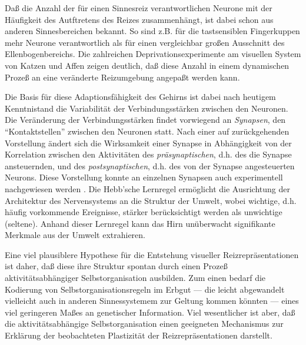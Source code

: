 Daß die Anzahl der für einen Sinnesreiz verantwortlichen Neurone mit der
Häufigkeit des Autftretens des Reizes zusammenhängt, ist dabei schon aus
anderen Sinnesbereichen bekannt. So sind z.B. für die tastsensiblen
Fingerkuppen mehr Neurone verantwortlich als für einen vergleichbar
großen Ausschnitt des Ellenbogenbereichs. Die zahlreichen
Deprivationsexperimente am visuellen System von Katzen und Affen zeigen
deutlich, daß diese Anzahl in einem dynamischen Prozeß an eine
veränderte Reizumgebung angepaßt werden kann.

Die Basis für diese Adaptionsfähigkeit des Gehirns ist dabei nach
heutigem Kenntnistand die Variabilität der Verbindungsstärken zwischen
den Neuronen. Die Veränderung der Verbindungsstärken findet vorwiegend
an \emph{Synapsen}, den ``Kontaktstellen'' zwischen den Neuronen statt.
Nach einer auf \textcite{hebb:1949} zurückgehenden Vorstellung ändert
sich die Wirksamkeit einer Synapse in Abhängigkeit von der Korrelation
zwischen den Aktivitäten des \emph{präsynaptischen}, d.h. des die Synapse
ansteuernden, und des \emph{postsynaptischen}, d.h. des von der Synapse
angesteuerten Neurons. Diese Vorstellung konnte an einzelnen Synapsen auch
experimentell nachgewiesen werden \cite{brown:1990,kirkwood:1994}. Die
Hebb'sche Lernregel ermöglicht die Ausrichtung der Architektur des
Nervensystems an die Struktur der Umwelt, wobei wichtige, d.h. häufig
vorkommende Ereignisse, stärker berücksichtigt werden als unwichtige
(seltene). Anhand dieser Lernregel kann das Hirn unüberwacht signifikante
Merkmale aus der Umwelt extrahieren.

Eine viel plausiblere Hypothese für die Entstehung visueller
Reizrepräsentationen ist daher, daß diese ihre Struktur spontan durch
einen Prozeß aktivitätsabhängiger Selbstorganisation ausbilden. Zum
einen bedarf die Kodierung von Selbstorganisationsregeln im Erbgut --- die
leicht abgewandelt vielleicht auch in anderen Sinnessystemem zur Geltung
kommen könnten --- eines viel geringeren Maßes an genetischer
Information. Viel wesentlicher ist aber, daß die aktivitätsabhängige
Selbstorganisation einen geeigneten Mechanismus zur Erklärung der
beobachteten Plastizität der Reizrepräsentationen darstellt.
